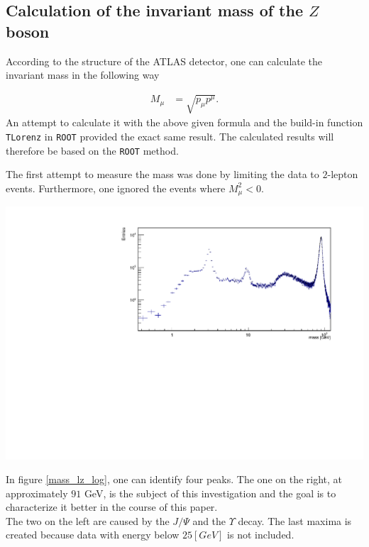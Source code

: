 \documentclass[12pt, a4paper, bibliography=totoc]{scrartcl}
\begin{document}
\begin{multicols}{2}
\subsection{Calculation of the invariant mass of the $Z$ boson}
According to the structure of the ATLAS detector, one can calculate the invariant mass in the following way

\begin{align}
	M_{\mu} &= \sqrt{p_{\mu}p^{\mu}}. 
\end{align}
An attempt to calculate it with the above given formula and the build-in function \verb*+TLorenz+ in \verb*+ROOT+ provided the exact same result. 
The calculated results will therefore be based on the \verb*+ROOT+ method.

The first attempt to measure the mass was done by limiting the data to $2$-lepton events. 
Furthermore, one ignored the events where $M_{\mu}^{2} < 0$. 
\begin{center}
	\includegraphics[width=\linewidth]{fig/invar_mass_dist_corrected_axis_title.pdf}
	\label{mass_lz_log}
\end{center}

In figure \ref{mass_lz_log}, one can identify four peaks. 
The one on the right, at approximately $91$ \si{GeV}, is the subject of this investigation and the goal is to characterize it better in the course of this paper.\\
The two on the left are caused by the $J/{\Psi}$ and the $\Upsilon$ decay. 
The last maxima is created because data with energy below $25 \si{[GeV]}$ is not included.


\end{multicols}
\end{document}
